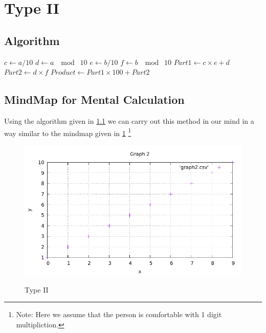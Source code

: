 \section{Type II}
\subsection{Algorithm}
\label{type II:algorithm}
	\begin{algorithm}
		\begin{algorithmic}
				\State $c \gets a/10$ 	
				\State $d \gets a \; \mod \; 10$ 	
				\State $e \gets b/10$ 
				\State $f \gets b \; \mod \; 10$ 	
					\State $Part1 \gets c \times e + d$
					\State $Part2 \gets d \times f$
					\State $Product \gets Part1 \times 100 + Part2$ 
				\Else
				\EndIf
			\EndProcedure
		\end{algorithmic}
	\end{algorithm}


\subsection{MindMap for Mental Calculation}
Using the algorithm given in \ref{type II:algorithm} we can carry out this method in our mind in a way similar to the mindmap given in \ref{Figure2}
\footnote{Note: Here we assume that the person is comfortable with 1 digit multipliction.}
\newpage
\begin{figure}[h]
	\label{Figure2}
	\centering
	\includegraphics[scale=1]{graph2.pdf} \\
	\caption{Type II}
\end{figure}
\newpage
